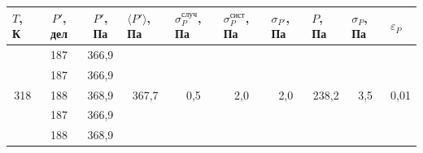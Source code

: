 \documentclass[a4paper,12pt]{article}
\begin{document}
\begin{table}[H]
\begin{tabular}{|c|c|c|c|c|c|c|c|c|c|}
\hline
\multicolumn{1}{|l|}{$ T $, К} & $ P' $, дел & $ P' $, Па & \multicolumn{1}{l|}{$ \langle P' \rangle $, Па} & \multicolumn{1}{l|}{$\sigma_P^{случ}$, Па} & \multicolumn{1}{l|}{$\sigma_P^{сист}$, Па} & \multicolumn{1}{l|}{$ \sigma_{P'} $, Па} & \multicolumn{1}{l|}{$ P $, Па} & \multicolumn{1}{l|}{$ \sigma_P $, Па} & \multicolumn{1}{l|}{$\varepsilon_P$} \\ \hline
\multirow{5}{*}{318}           & 187         & 366,9      & \multirow{5}{*}{367,7}                          & \multirow{5}{*}{0,5}                       & \multirow{5}{*}{2,0}                       & \multirow{5}{*}{2,0}                     & \multirow{5}{*}{238,2}         & \multirow{5}{*}{3,5}                  & \multirow{5}{*}{0,01}                \\ \cline{2-3}
                               & 187         & 366,9      &                                                 &                                            &                                            &                                          &                                &                                       &                                      \\ \cline{2-3}
                               & 188         & 368,9      &                                                 &                                            &                                            &                                          &                                &                                       &                                      \\ \cline{2-3}
                               & 187         & 366,9      &                                                 &                                            &                                            &                                          &                                &                                       &                                      \\ \cline{2-3}
                               & 188         & 368,9      &                                                 &                                            &                                            &                                          &                                &                                       &                                      \\ \hline
\end{tabular}
\end{table}
\end{document}
